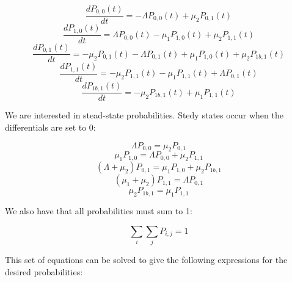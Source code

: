 \documentclass{article}
\begin{document}
\begin{equation*}
    \frac{d P_{0,0}(t)}{dt} = - \Lambda P_{0,0}(t) + \mu_2 P_{0,1}(t)
\end{equation*}
\begin{equation*}
    \frac{d P_{1,0}(t)}{dt} = \Lambda P_{0,0}(t) - \mu_1 P_{1,0}(t) + \mu_2 P_{1,1}(t)
\end{equation*}
\begin{equation*}
    \frac{d P_{0,1}(t)}{dt} = - \mu_2 P_{0,1}(t) - \Lambda P_{0,1}(t) + \mu_1 P_{1,0}(t) + \mu_2 P_{1b,1}(t)
\end{equation*}
\begin{equation*}
    \frac{d P_{1,1}(t)}{dt} = - \mu_2 P_{1,1}(t) - \mu_1 P_{1,1}(t) + \Lambda P_{0,1}(t)
\end{equation*}
\begin{equation*}
    \frac{d P_{1b,1}(t)}{dt} = - \mu_2 P_{1b,1}(t) + \mu_1 P_{1,1}(t)
\end{equation*}

We are interested in stead-state probabilities. Stedy states occur when the differentials are set to 0:

\begin{equation*}
    \Lambda P_{0,0} = \mu_2 P_{0,1}
\end{equation*}
\begin{equation*}
    \mu_1 P_{1,0} = \Lambda P_{0,0} + \mu_2 P_{1,1}
\end{equation*}
\begin{equation*}
    (\Lambda + \mu_2) P_{0,1} = \mu_1 P_{1,0} + \mu_2 P_{1b,1}
\end{equation*}
\begin{equation*}
    (\mu_1 + \mu_2) P_{1,1} = \Lambda P_{0,1}
\end{equation*}
\begin{equation*}
    \mu_2 P_{1b,1} = \mu_1 P_{1,1}
\end{equation*}

We also have that all probabilities must sum to 1:

\begin{equation*}
    \sum_i \sum_j P_{i,j} = 1
\end{equation*}

This set of equations can be solved to give the following expressions for the desired probabilities:
\end{document}
